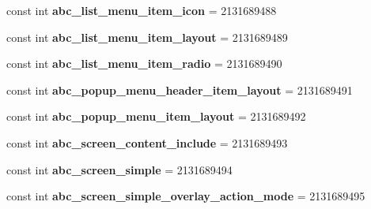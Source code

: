 \begin{DoxyCompactItemize}
\mbox{\label{classst_delivery_1_1_resource_1_1_layout_ae08d23e31f8268d3d5892ab49db565f6}} 
const int {\bfseries abc\+\_\+list\+\_\+menu\+\_\+item\+\_\+icon} = 2131689488
\item 
\mbox{\label{classst_delivery_1_1_resource_1_1_layout_a874521b5d22a9745492100587b598f7d}} 
const int {\bfseries abc\+\_\+list\+\_\+menu\+\_\+item\+\_\+layout} = 2131689489
\item 
\mbox{\label{classst_delivery_1_1_resource_1_1_layout_a1bb9bfff60c46cd0d9fde5aa80618946}} 
const int {\bfseries abc\+\_\+list\+\_\+menu\+\_\+item\+\_\+radio} = 2131689490
\item 
\mbox{\label{classst_delivery_1_1_resource_1_1_layout_a09df38f3a57450053816f1ca364a8217}} 
const int {\bfseries abc\+\_\+popup\+\_\+menu\+\_\+header\+\_\+item\+\_\+layout} = 2131689491
\item 
\mbox{\label{classst_delivery_1_1_resource_1_1_layout_a37bb43aebfa1e2bfa0d1ef9a9609b91d}} 
const int {\bfseries abc\+\_\+popup\+\_\+menu\+\_\+item\+\_\+layout} = 2131689492
\item 
\mbox{\label{classst_delivery_1_1_resource_1_1_layout_a45a8582293ffca248395910aeadbee09}} 
const int {\bfseries abc\+\_\+screen\+\_\+content\+\_\+include} = 2131689493
\item 
\mbox{\label{classst_delivery_1_1_resource_1_1_layout_ad2b4812aa889d73b1bb26318d5c771e2}} 
const int {\bfseries abc\+\_\+screen\+\_\+simple} = 2131689494
\item 
\mbox{\label{classst_delivery_1_1_resource_1_1_layout_a9f795f5ee6375a698e6384acab0c0df5}} 
const int {\bfseries abc\+\_\+screen\+\_\+simple\+\_\+overlay\+\_\+action\+\_\+mode} = 2131689495
\item 
\mbox{\label{classst_delivery_1_1_resource_1_1_layout_a039af1d1ad848ac2d564f621f714305c}} 

\end{DoxyCompactItemize}
